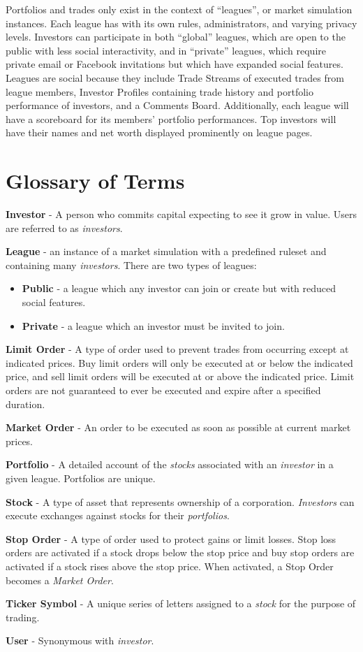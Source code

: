 Portfolios and trades only exist in the context of “leagues”, or market simulation instances. 
Each league has with its own rules, administrators, and varying privacy levels. Investors can 
participate in both “global” leagues, which are open to the public with less social interactivity, 
and in “private” leagues, which require private email or Facebook invitations but which have 
expanded social features. Leagues are social because they include Trade Streams of executed trades 
from league members, Investor Profiles containing trade history and portfolio performance of 
investors, and a Comments Board. Additionally, each league will have a scoreboard for its members’
portfolio performances. Top investors will have their names and net worth displayed prominently on
league pages. 

\section{Glossary of Terms}

{
\raggedright
\textbf{Investor} - A person who commits capital expecting to see it grow in value. Users are referred 
to as \emph{investors}.

\textbf{League} - an instance of a market simulation with a predefined ruleset and containing many 
\emph{investors}. There are two types of leagues:

\begin{itemize}
\item \textbf{ Public} - a league which any investor can join or create but with reduced
social features.
\item \textbf{ Private} - a league which an investor must be invited to join.
\end{itemize}

\textbf{Limit Order} - A type of order used to prevent trades from occurring except at indicated
prices. Buy limit orders will only be executed at or below the indicated price, and sell limit
orders will be executed at or above the indicated price. Limit orders are not guaranteed to ever
be executed and expire after a specified duration.

\textbf{Market Order} - An order to be executed as soon as possible at current market prices.

\textbf{Portfolio} - A detailed account of the \emph{stocks} associated with an \emph{investor} 
in a given league. Portfolios are unique. 

\textbf{Stock} - A type of asset that represents ownership of a corporation. \emph{Investors} can
execute exchanges against stocks for their \emph{portfolios}.

\textbf{Stop Order} - A type of order used to protect gains or limit losses. Stop loss
orders are activated if a stock drops below the stop price and buy stop orders
are activated if a stock rises above the stop price. When activated, a Stop Order becomes a
\emph{Market Order}. 

\textbf{Ticker Symbol} - A unique series of letters assigned to a \emph{stock} for the purpose of
trading.

\textbf{User} - Synonymous with \emph{investor}.

}
